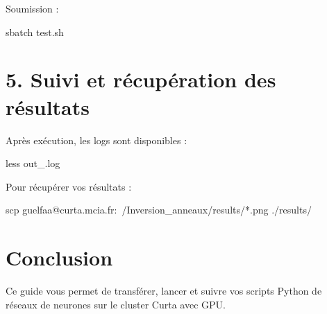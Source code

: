 \documentclass[a4paper,12pt]{article}
\begin{document}
Soumission :
\begin{terminal}
sbatch test.sh
\end{terminal}

\section{5. Suivi et récupération des résultats}

Après exécution, les logs sont disponibles :
\begin{terminal}
less out\_.log
\end{terminal}

Pour récupérer vos résultats :
\begin{terminal}
scp guelfaa@curta.mcia.fr:~/Inversion\_anneaux/results/*.png ./results/
\end{terminal}

\section{Conclusion}
Ce guide vous permet de transférer, lancer et suivre vos scripts Python de réseaux de neurones sur le cluster Curta avec GPU.\newline
\end{document}
